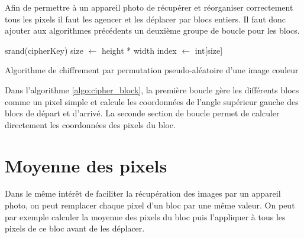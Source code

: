 \documentclass[a4paper]{article}
\begin{document}
        Afin de permettre à un appareil photo de récupérer et réorganiser correctement tous les pixels il faut les agencer et les déplacer par blocs entiers. Il faut donc ajouter aux algorithmes précédents un deuxième groupe de boucle pour les blocs.

        \begin{algorithm}[htbp]
            \SetAlgoLined
            srand(cipherKey)\;
            size $\leftarrow$ height * width\;
            index $\leftarrow$ int[size]\;
            \caption{Algorithme de chiffrement par permutation pseudo-aléatoire d'une image couleur}
            \label{algo:cipher_block}
        \end{algorithm}

        Dans l'algorithme \ref{algo:cipher_block}, la première boucle gère les différents blocs comme un pixel simple et calcule les coordonnées de l'angle supérieur gauche des blocs de départ et d'arrivé. La seconde section de boucle permet de calculer directement les coordonnées des pixels du bloc.

    \section{Moyenne des pixels}

        Dans le même intérêt de faciliter la récupération des images par un appareil photo, on peut remplacer chaque pixel d'un bloc par une même valeur. On peut par exemple calculer la moyenne des pixels du bloc puis l'appliquer à tous les pixels de ce bloc avant de les déplacer.
\end{document}
